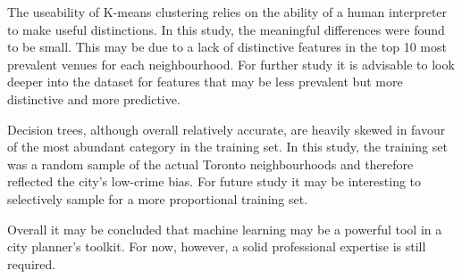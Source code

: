 \documentclass{article}
\begin{document}
The useability of K-means clustering relies on the ability of a human interpreter to make useful distinctions. In this study, the meaningful differences were found to be small. This may be due to a lack of distinctive features in the top 10 most prevalent venues for each neighbourhood. For further study it is advisable to look deeper into the dataset for features that may be less prevalent but more distinctive and more predictive.

Decision trees, although overall relatively accurate, are heavily skewed in favour of the most abundant category in the training set. In this study, the training set was a random sample of the actual Toronto neighbourhoods and therefore reflected the city's low-crime bias. For future study it may be interesting to selectively sample for a more proportional training set.

Overall it may be concluded that machine learning may be a powerful tool in a city planner's toolkit. For now, however, a solid professional expertise is still required.
 
\end{document}
